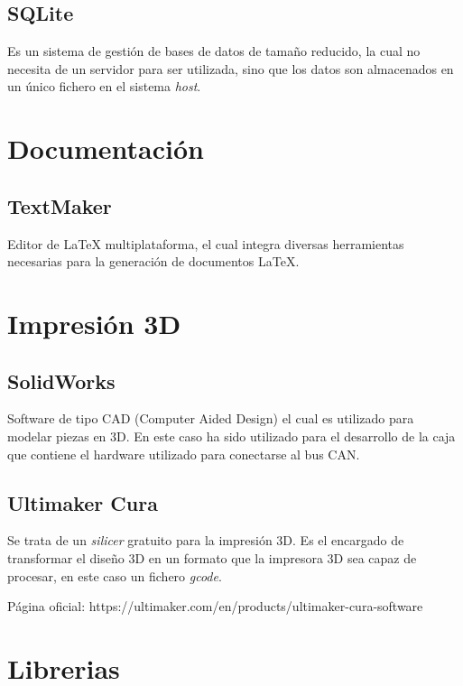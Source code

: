 \subsection{SQLite}\label{sqlite}

Es un sistema de gestión de bases de datos de tamaño reducido, la cual no necesita de un servidor para ser utilizada, sino que los datos son almacenados en un único fichero en el sistema \emph{host}.

\section{Documentación}\label{documentacion}

\subsection{TextMaker}\label{textmaker}

Editor de LaTeX multiplataforma, el cual integra diversas herramientas necesarias para la generación de documentos LaTeX.

\section{Impresión 3D}\label{impresion3d}

\subsection{SolidWorks}\label{solidworks}

Software de tipo CAD (Computer Aided Design) el cual es utilizado para modelar piezas en 3D. En este caso ha sido utilizado para el desarrollo de la caja que contiene el hardware utilizado para conectarse al bus CAN.

\subsection{Ultimaker Cura}\label{ultimaker_cura}

Se trata de un \emph{silicer} gratuito para la impresión 3D. Es el encargado de transformar el diseño 3D en un formato que la impresora 3D sea capaz de procesar, en este caso un fichero \emph{gcode}.

Página oficial: https://ultimaker.com/en/products/ultimaker-cura-software

\section{Librerias}\label{librerias}

